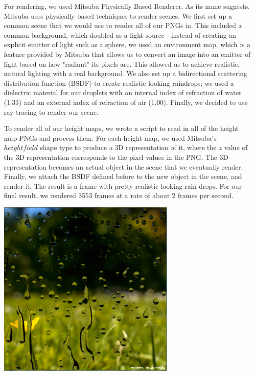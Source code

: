 \documentclass[10pt,twocolumn,letterpaper]{article}
\newenvironment{Figure}
  {\par\medskip\noindent\minipage{\linewidth}}
  {\endminipage\par\medskip}
\begin{document}
For rendering, we used Mitsuba Physically Based Renderer. As its name suggests, Mitsuba uses physically based techniques to render scenes. We first set up a common scene that we would use to render all of our PNGs in. This included a common background, which doubled as a light source - instead of creating an explicit emitter of light such as a sphere, we used an environment map, which is a feature provided by Mitsuba that allows us to convert an image into an emitter of light based on how "radiant" its pixels are. This allowed us to achieve realistic, natural lighting with a real background. We also set up a bidirectional scattering distribution function (BSDF) to create realistic looking raindrops; we used a dielectric material for our droplets with an internal index of refraction of water (1.33) and an external index of refraction of air (1.00). Finally, we decided to use ray tracing to render our scene.

To render all of our height maps, we wrote a script to read in all of the height map PNGs and process them. For each height map, we used Mitsuba's $heightfield$ shape type to produce a 3D representation of it, where the $z$ value of the 3D representation corresponds to the pixel values in the PNG. The 3D representation becomes an actual object in the scene that we eventually render. Finally, we attach the BSDF defined before to the new object in the scene, and render it. The result is a frame with pretty realistic looking rain drops. For our final result, we rendered 3553 frames at a rate of about 2 frames per second.

\begin{Figure}
    \centering
    \includegraphics[width=250pt]{rendered3553.PNG}
    \label{fig:render}
\end{Figure}
\end{document}
